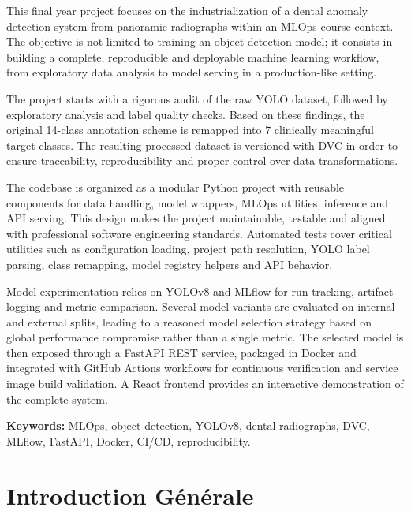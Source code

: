 \documentclass[a4paper,12pt]{report}
\begin{document}
This final year project focuses on the industrialization of a dental anomaly detection system from panoramic radiographs within an MLOps course context. The objective is not limited to training an object detection model; it consists in building a complete, reproducible and deployable machine learning workflow, from exploratory data analysis to model serving in a production-like setting.

The project starts with a rigorous audit of the raw YOLO dataset, followed by exploratory analysis and label quality checks. Based on these findings, the original 14-class annotation scheme is remapped into 7 clinically meaningful target classes. The resulting processed dataset is versioned with DVC in order to ensure traceability, reproducibility and proper control over data transformations.

The codebase is organized as a modular Python project with reusable components for data handling, model wrappers, MLOps utilities, inference and API serving. This design makes the project maintainable, testable and aligned with professional software engineering standards. Automated tests cover critical utilities such as configuration loading, project path resolution, YOLO label parsing, class remapping, model registry helpers and API behavior.

Model experimentation relies on YOLOv8 and MLflow for run tracking, artifact logging and metric comparison. Several model variants are evaluated on internal and external splits, leading to a reasoned model selection strategy based on global performance compromise rather than a single metric. The selected model is then exposed through a FastAPI REST service, packaged in Docker and integrated with GitHub Actions workflows for continuous verification and service image build validation. A React frontend provides an interactive demonstration of the complete system.

\textbf{Keywords:} MLOps, object detection, YOLOv8, dental radiographs, DVC, MLflow, FastAPI, Docker, CI/CD, reproducibility.

\tableofcontents
\listoffigures
\listoftables
\newpage


\chapter{Introduction G\'en\'erale}
\end{document}
